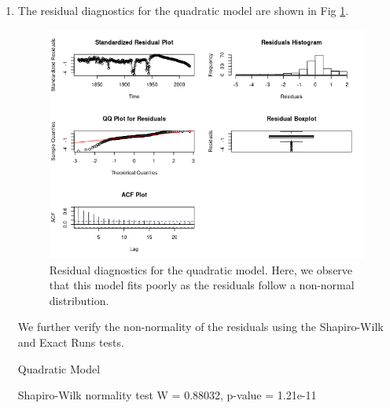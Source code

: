 \begin{enumerate}[label=(\alph*)]
\begin{block}
Residual standard error: 180.1 on 201 degrees of freedom
Multiple R-squared:  0.9625,	Adjusted R-squared:  0.9621 
F-statistic:  2579 on 2 and 201 DF,  p-value: < 2.2e-16
\end{block}
\normalsize
\item The residual diagnostics for the quadratic model are shown in Fig \ref{fig:res_qfit_fle}.
\begin{figure}[!htb]
    \centering
    \includegraphics[width=\linewidth]{Images/P4/Residual_QFit.png}
    \caption[Residual diagnostics for the quadratic model.]{Residual diagnostics for the quadratic model. Here, we observe that this model fits poorly as the residuals follow a non-normal distribution.}
    \label{fig:res_qfit_fle}
\end{figure}
We further verify the non-normality of the residuals using the Shapiro-Wilk and Exact Runs tests.
\small\begin{block}
Quadratic Model

Shapiro-Wilk normality test
W = 0.88032, p-value = 1.21e-11


\end{block}
\end{enumerate}
